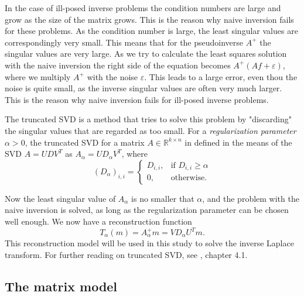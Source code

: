 \documentclass[12pt,a4]{article}
\newcommand{\R}{{\mathbb R}}
\newcommand{\eps}{\varepsilon}
\begin{document}
In the case of ill-posed inverse problems the condition numbers are large and grow as the size of the matrix grows. This is the reason why naive inversion fails for these problems. As the condition number is large, the least singular values are correspondingly very small. This means that for the pseudoinverse $A^+$ the singular values are very large. As we try to calculate the least squares solution with the naive inversion the right side of the equation becomes $A^+ (Af + \eps)$, where we multiply $A^+$ with the noise $\eps$. This leads to a large error, even thou the noise is quite small, as the inverse singular values are often very much larger. This is the reason why naive inversion fails for ill-posed inverse problems.

The truncated SVD is a method that tries to solve this problem by "discarding" the singular values that are regarded as too small. For a \emph{regularization parameter} $\alpha > 0$, the truncated SVD for a matrix $A \in \R^{k \times n}$ in defined in the means of the SVD $A = U D V^T$ as $A_{\alpha} = U D_{\alpha} V^T$, where
\begin{equation}
(D_{\alpha})_{i,i} =
\begin{cases}
D_{i,i}, & \text{if } D_{i,i} \geq \alpha \\
0,       & \text{otherwise}.
\end{cases}
\end{equation}

Now the least singular value of $A_{\alpha}$ is no smaller that $\alpha$, and the problem with the naive inversion is solved, as long as the regularization parameter can be chosen well enough. We now have a reconstruction function
\begin{equation}
T_{\alpha}(m) = A_{\alpha}^+ m = V D_{\alpha} U^T m.
\end{equation}
This reconstruction model will be used in this study to solve the inverse Laplace transform. For further reading on truncated SVD, see \cite{samu}, chapter 4.1.



\subsection{The matrix model}\label{sec:matrixmodel}
\end{document}
